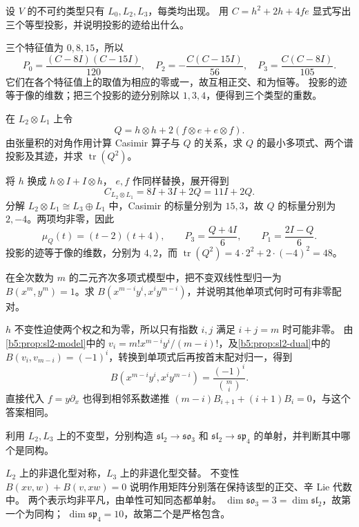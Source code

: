 \begin{exercise}\label{b5:ex:14-casimir-projections}
	设 \(V\) 的不可约类型只有 \(L_0,L_2,L_3\)，每类均出现。 用 \(C=h^2+2h+4fe\) 显式写出三个等型投影，并说明投影的迹给出什么。
\end{exercise}
\begin{solution}
	三个特征值为 \(0,8,15\)，所以
	\[
		P_0=\frac{(C-8I)(C-15I)}{120},\quad P_2=-\frac{C(C-15I)}{56},\quad P_3=\frac{C(C-8I)}{105}.
	\]
	它们在各个特征值上的取值为相应的零或一，故互相正交、和为恒等。 投影的迹等于像的维数；把三个投影的迹分别除以 \(1,3,4\)，便得到三个类型的重数。
\end{solution}

\begin{exercise}\label{b5:ex:14-tensor-casimir}
	在 \(L_2\otimes L_1\) 上令
	\[
		Q=h\otimes h+2(f\otimes e+e\otimes f).
	\]
	由张量积的对角作用计算 Casimir 算子与 \(Q\) 的关系，求 \(Q\) 的最小多项式、两个谱投影及其迹，并求 \(\operatorname{tr}(Q^2)\)。
\end{exercise}
\begin{solution}
	将 \(h\) 换成 \(h\otimes I+I\otimes h\)， \(e,f\) 作同样替换，展开得到
	\[
		C_{L_2\otimes L_1}=8I+3I+2Q=11I+2Q.
	\]
	分解 \(L_2\otimes L_1\cong L_3\oplus L_1\) 中，Casimir 的标量分别为 \(15,3\)，故 \(Q\) 的标量分别为 \(2,-4\)。两项均非零，因此
	\[
		\mu_Q(t)=(t-2)(t+4),\qquad P_3=\frac{Q+4I}{6},\qquad P_1=\frac{2I-Q}{6}.
	\]
	投影的迹等于像的维数，分别为 \(4,2\)，而 \(\operatorname{tr}(Q^2)=4\cdot2^2+2\cdot(-4)^2=48\)。
\end{solution}

\begin{exercise}\label{b5:ex:14-polynomial-pairing}
	在全次数为 \(m\) 的二元齐次多项式模型中，把不变双线性型归一为 \(B(x^m,y^m)=1\)。求 \(B(x^{m-i}y^i,x^iy^{m-i})\)，并说明其他单项式何时可有非零配对。
\end{exercise}
\begin{solution}
	\(h\) 不变性迫使两个权之和为零，所以只有指数 \(i,j\) 满足 \(i+j=m\) 时可能非零。 由\cref{b5:prop:sl2-model}中的 \(v_i=m!x^{m-i}y^i/(m-i)!\)，及\cref{b5:prop:sl2-dual}中的 \(B(v_i,v_{m-i})=(-1)^i\)，转换到单项式后再按首末配对归一，得到
	\[
		B(x^{m-i}y^i,x^iy^{m-i}) =\frac{(-1)^i}{\binom mi}.
	\]
	直接代入 \(f=y\partial_x\) 也得到相邻系数递推 \((m-i)B_{i+1}+(i+1)B_i=0\)，与这个答案相同。
\end{solution}

\begin{exercise}\label{b5:ex:14-orthogonal-symplectic}
	利用 \(L_2,L_3\) 上的不变型，分别构造 \(\mathfrak{sl}_2\to\mathfrak{so}_3\) 和 \(\mathfrak{sl}_2\to\mathfrak{sp}_4\) 的单射，并判断其中哪个是同构。
\end{exercise}
\begin{solution}
	\(L_2\) 上的非退化型对称，\(L_3\) 上的非退化型交替。 不变性 \(B(xv,w)+B(v,xw)=0\) 说明作用矩阵分别落在保持该型的正交、辛 Lie 代数中。 两个表示均非平凡，由单性可知同态都单射。 \(\dim\mathfrak{so}_3=3=\dim\mathfrak{sl}_2\)，故第一个为同构； \(\dim\mathfrak{sp}_4=10\)，故第二个是严格包含。
\end{solution}

